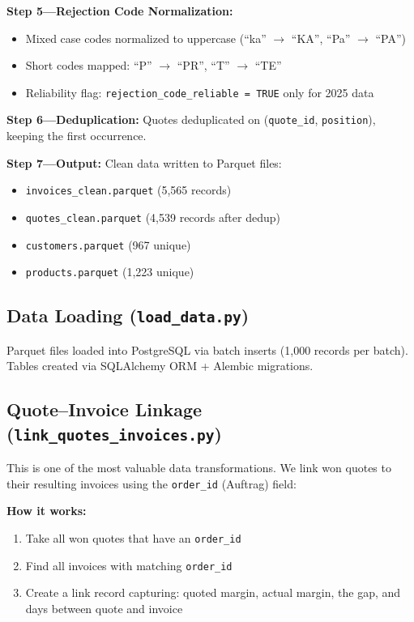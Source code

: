 \documentclass[11pt,a4paper]{article}
\newcommand{\code}[1]{\texttt{#1}}
\begin{document}
\textbf{Step 5---Rejection Code Normalization:}
\begin{itemize}[nosep]
  \item Mixed case codes normalized to uppercase (``ka'' $\to$ ``KA'', ``Pa'' $\to$ ``PA'')
  \item Short codes mapped: ``P'' $\to$ ``PR'', ``T'' $\to$ ``TE''
  \item Reliability flag: \code{rejection\_code\_reliable = TRUE} only for 2025 data
\end{itemize}

\textbf{Step 6---Deduplication:} Quotes deduplicated on (\code{quote\_id}, \code{position}), keeping the first occurrence.

\textbf{Step 7---Output:} Clean data written to Parquet files:
\begin{itemize}[nosep]
  \item \code{invoices\_clean.parquet} (5{,}565 records)
  \item \code{quotes\_clean.parquet} (4{,}539 records after dedup)
  \item \code{customers.parquet} (967 unique)
  \item \code{products.parquet} (1{,}223 unique)
\end{itemize}

\subsection{Data Loading (\code{load\_data.py})}

Parquet files loaded into PostgreSQL via batch inserts (1{,}000 records per batch). Tables created via SQLAlchemy ORM + Alembic migrations.

\subsection{Quote--Invoice Linkage (\code{link\_quotes\_invoices.py})}

This is one of the most valuable data transformations. We link won quotes to their resulting invoices using the \code{order\_id} (Auftrag) field:

\textbf{How it works:}
\begin{enumerate}[nosep]
  \item Take all won quotes that have an \code{order\_id}
  \item Find all invoices with matching \code{order\_id}
  \item Create a link record capturing: quoted margin, actual margin, the gap, and days between quote and invoice
\end{enumerate}
\end{document}
